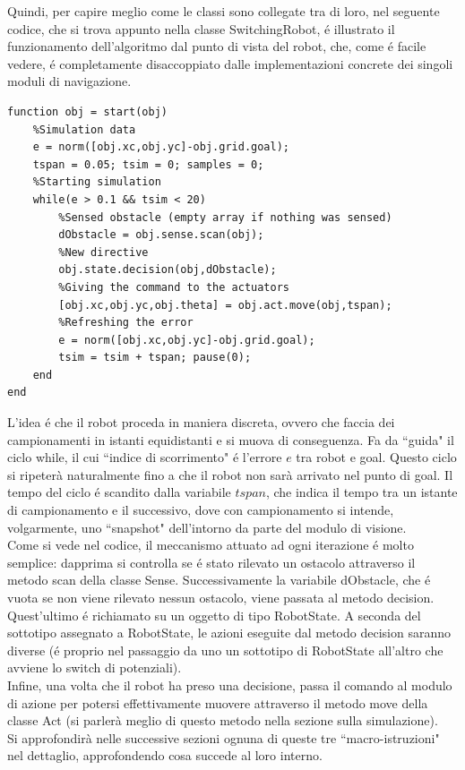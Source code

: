 \documentclass[14pt,a4paper]{extarticle}
\begin{document}
Quindi, per capire meglio come le classi sono collegate tra di loro, nel seguente codice, che si trova appunto nella classe SwitchingRobot, é illustrato il funzionamento dell'algoritmo dal punto di vista del robot, che, come é facile vedere, é completamente disaccoppiato dalle implementazioni concrete dei singoli moduli di navigazione.
\begin{lstlisting}[caption=Entry point del modulo software, label=start]
function obj = start(obj)
	%Simulation data
	e = norm([obj.xc,obj.yc]-obj.grid.goal);
	tspan = 0.05; tsim = 0; samples = 0;
	%Starting simulation
	while(e > 0.1 && tsim < 20)
		%Sensed obstacle (empty array if nothing was sensed)
		dObstacle = obj.sense.scan(obj);
		%New directive
		obj.state.decision(obj,dObstacle);
		%Giving the command to the actuators 
		[obj.xc,obj.yc,obj.theta] = obj.act.move(obj,tspan);
		%Refreshing the error
		e = norm([obj.xc,obj.yc]-obj.grid.goal); 
		tsim = tsim + tspan; pause(0);
	end
end
\end{lstlisting}
L'idea é che il robot proceda in maniera discreta, ovvero che faccia dei campionamenti in istanti equidistanti e si muova di conseguenza. Fa da ``guida" il ciclo while, il cui ``indice di scorrimento" é l'errore \(e\) tra robot e goal. Questo ciclo si ripeterà naturalmente fino a che il robot non sarà arrivato nel punto di goal. Il tempo del ciclo é scandito dalla variabile \(tspan\), che indica il tempo tra un istante di campionamento e il successivo, dove con campionamento si intende, volgarmente, uno ``snapshot" dell'intorno da parte del modulo di visione. \\
Come si vede nel codice, il meccanismo attuato ad ogni iterazione é molto semplice: dapprima si controlla se é stato rilevato un ostacolo attraverso il metodo scan della classe Sense. Successivamente la variabile dObstacle, che é vuota se non viene rilevato nessun ostacolo, viene passata al metodo decision.\\
Quest'ultimo é richiamato su un oggetto di tipo RobotState. A seconda del sottotipo assegnato a RobotState, le azioni eseguite dal metodo decision saranno diverse (é proprio nel passaggio da uno un sottotipo di RobotState all'altro che avviene lo switch di potenziali).\\
Infine, una volta che il robot ha preso una decisione, passa il comando al modulo di azione per potersi effettivamente muovere attraverso il metodo move della classe Act (si parlerà meglio di questo metodo nella sezione sulla simulazione).\\ 
Si approfondirà nelle successive sezioni ognuna di queste tre ``macro-istruzioni" nel dettaglio, approfondendo cosa succede al loro interno.
\end{document}
